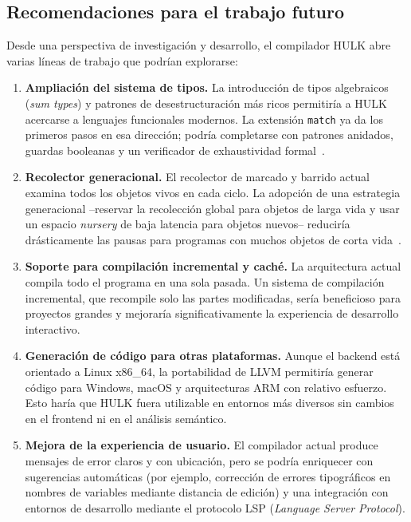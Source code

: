 \documentclass[12pt, a4paper]{article}
\begin{document}
\subsection{Recomendaciones para el trabajo futuro}

Desde una perspectiva de investigación y desarrollo, el compilador HULK abre varias líneas de trabajo que podrían explorarse:

\begin{enumerate}[leftmargin=1.4em, itemsep=0.35em]
	\item \textbf{Ampliación del sistema de tipos.} La introducción de tipos algebraicos (\textit{sum types}) y patrones de desestructuración más ricos permitiría a HULK acercarse a lenguajes funcionales modernos. La extensión \texttt{match} ya da los primeros pasos en esa dirección; podría completarse con patrones anidados, guardas booleanas y un verificador de exhaustividad formal~\cite{marlow2010}.
	
	\item \textbf{Recolector generacional.} El recolector de marcado y barrido actual examina todos los objetos vivos en cada ciclo. La adopción de una estrategia generacional --reservar la recolección global para objetos de larga vida y usar un espacio \textit{nursery} de baja latencia para objetos nuevos-- reduciría drásticamente las pausas para programas con muchos objetos de corta vida~\cite{baconrajan2001,jones2011}.
	
	\item \textbf{Soporte para compilación incremental y caché.} La arquitectura actual compila todo el programa en una sola pasada. Un sistema de compilación incremental, que recompile solo las partes modificadas, sería beneficioso para proyectos grandes y mejoraría significativamente la experiencia de desarrollo interactivo.
	
	\item \textbf{Generación de código para otras plataformas.} Aunque el backend está orientado a Linux x86\_64, la portabilidad de LLVM permitiría generar código para Windows, macOS y arquitecturas ARM con relativo esfuerzo. Esto haría que HULK fuera utilizable en entornos más diversos sin cambios en el frontend ni en el análisis semántico.
	
	\item \textbf{Mejora de la experiencia de usuario.} El compilador actual produce mensajes de error claros y con ubicación, pero se podría enriquecer con sugerencias automáticas (por ejemplo, corrección de errores tipográficos en nombres de variables mediante distancia de edición) y una integración con entornos de desarrollo mediante el protocolo LSP (\textit{Language Server Protocol}).
\end{enumerate}
\end{document}
